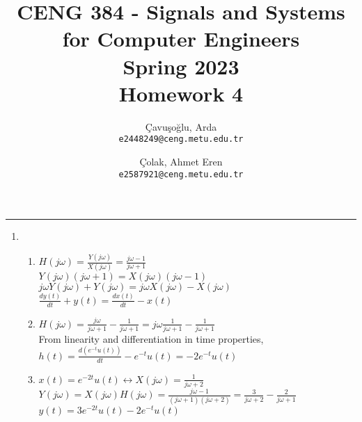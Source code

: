 \documentclass[10pt,a4paper, margin=1in]{article}
\author{
  Çavuşoğlu, Arda\\
  \texttt{e2448249@ceng.metu.edu.tr}
  \and
  Çolak, Ahmet Eren\\
  \texttt{e2587921@ceng.metu.edu.tr}
}
\title{CENG 384 - Signals and Systems for Computer Engineers \\
Spring 2023 \\
Homework 4}
\begin{document}
\maketitle



\noindent\rule{19cm}{1.2pt}

\begin{enumerate}

\item %
	\begin{enumerate}   
    
    \item %
    $H(j\omega) = \frac{Y(j\omega)}{X(j\omega)} = \frac{j\omega-1}{j\omega+1}$ \vspace{0.2cm}\\
    $Y(j\omega)(j\omega+1) = X(j\omega)(j\omega-1)$ \vspace{0.2cm}\\
    $j\omega Y(j\omega)+Y(j\omega) = j\omega X(j\omega)-X(j\omega)$ \vspace{0.2cm}\\
    $\frac{dy(t)}{dt} + y(t) = \frac{dx(t)}{dt} - x(t)$ \vspace{0.2cm}\\
    
    \item %
    $H(j\omega) = \frac{j\omega}{j\omega+1}-\frac{1}{j\omega+1} = j\omega \frac{1}{j\omega+1} - \frac{1}{j\omega+1}$ \vspace{0.2cm}\\
    From linearity and differentiation in time properties,\vspace{0.2cm}\\
    $h(t) = \frac{d(e^{-t}u(t))}{dt}-e^{-t}u(t) = -2e^{-t}u(t)$ \vspace{0.2cm}\\
    
    \item %
    $x(t) = e^{-2t}u(t) \longleftrightarrow X(j\omega) = \frac{1}{j\omega+2}$ \vspace{0.2cm}\\
    $Y(j\omega) = X(j\omega)H(j\omega) = \frac{j\omega-1}{(j\omega+1)(j\omega+2)} = \frac{3}{j\omega+2} - \frac{2}{j\omega+1}$ \vspace{0.2cm}\\
    $y(t) = 3e^{-2t}u(t) - 2e^{-t}u(t)$ \vspace{0.2cm}\\
    

\end{enumerate}
\end{enumerate}
\end{document}
